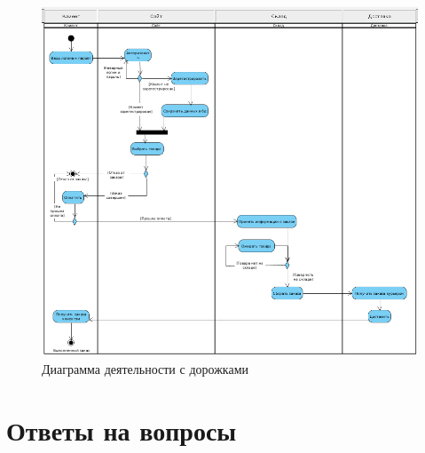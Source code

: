 \begin{figure}[h!tp]
	\centering
	\includegraphics[width=1\textwidth]{Screenshot from 2023-04-19 13-16-26}
	\caption{Диаграмма деятельности с дорожками}
	\label{fig:activity}
\end{figure}


\clearpage

\section*{Ответы на вопросы}

